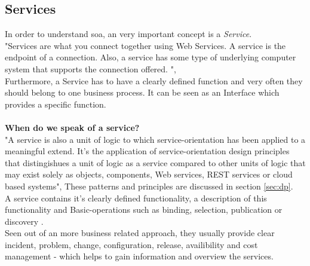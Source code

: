 \documentclass[12pt]{article}
\begin{document}
\subsection{Services}
In order to understand \gls{soa}, an very important concept is a \textit{Service}. \\
"Services are what you connect together using Web Services. A service is the endpoint of a connection. Also, a service has some type of underlying computer system that supports the connection offered. ",\cite{service1} \\ Furthermore, a Service has to have a clearly defined function and very often they should belong to one business process. It can be seen as an Interface which provides a specific function.\\ \\
\textbf{When do we speak of a service?}\\
"A service is also a unit of logic to which service-orientation has been applied to a meaningful extend. It's the application of service-orientation design principles that distingishues a unit of logic as a service compared to other units of logic that may exist solely as objects, components, Web services, REST services or cloud based systems",\cite[page 29]{grau} These patterns and principles are discussed in section \ref{sec:dp}. \\
A service contains it's clearly defined functionality, a description of this functionality and Basic-operations such as binding, selection, publication or discovery \cite[page 8]{soagoesreal}.  \\
Seen out of an more business related approach, they usually provide clear incident, problem, change, configuration, release, availibility and cost management - which helps to gain information and overview the services.
\end{document}
